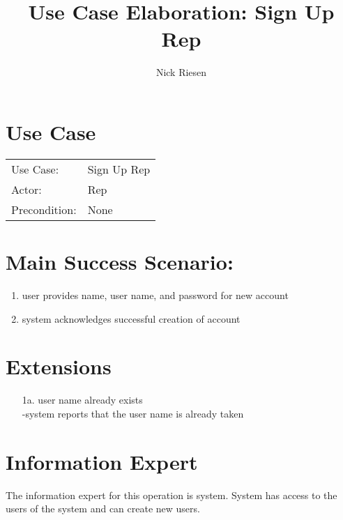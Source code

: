 \documentclass{article}
\title{Use Case Elaboration: Sign Up Rep}
\author{ Nick Riesen }
\begin{document}
\maketitle


\section*{Use Case}
\begin{tabular}{l l}
Use Case:     & Sign Up Rep \\
Actor:        & Rep         \\
Precondition: & None        \\
\end{tabular}


\section*{Main Success Scenario:}

\begin{enumerate}
    \item user provides name, user name, and password for new account
    \item system acknowledges successful creation of account

\end{enumerate}

\section*{Extensions}

\begin{itemize}
    \item [1a.]user name already exists \\
        -system reports that the user name is already taken
                            
\end{itemize}


\section*{Information Expert}
The information expert for this operation is system. System has access to the users of the system and can create new users.
\end{document}
